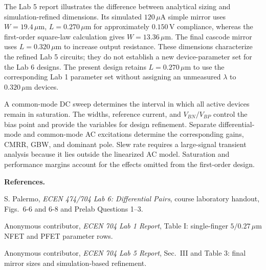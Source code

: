 \documentclass[12pt,letterpaper]{article}
\newcommand{\um}{\,\mu\mathrm{m}}
\newcommand{\uA}{\,\mu\mathrm{A}}
\newcommand{\V}{\,\mathrm{V}}
\begin{document}
The Lab 5 report illustrates the difference between analytical
sizing and simulation-refined dimensions. Its simulated $120\uA$
simple mirror uses $W=19.4\um$,
$L=0.270\um$ for approximately $0.150\V$ compliance, whereas
the first-order square-law calculation gives $W=13.36\um$.
The final cascode mirror uses $L=0.320\um$ to increase output
resistance. These dimensions characterize the refined Lab 5 circuits;
they do not establish a new device-parameter set for the Lab 6 designs.
The present design retains $L=0.270\um$ to use the corresponding
Lab 1 parameter set without assigning an unmeasured $\lambda$
to $0.320\um$ devices.

A common-mode DC sweep determines the interval in which all active
devices remain in saturation. The widths, reference current, and
$V_{BN}/V_{BP}$ control the bias point and provide the variables
for design refinement. Separate differential-mode
and common-mode AC excitations determine the corresponding gains,
CMRR, GBW, and dominant pole. Slew rate requires a large-signal
transient analysis because it lies outside the linearized AC model.
Saturation and performance margins account for the effects omitted
from the first-order design.

\vspace{12pt}
\textbf{References.}
\begin{enumerate}[label={[\arabic*]},leftmargin=0.3in,
topsep=4pt,itemsep=5pt,parsep=0pt]
\item S. Palermo, \emph{ECEN 474/704 Lab 6: Differential Pairs},
course laboratory handout, Figs.~6-6 and 6-8 and Prelab Questions 1--3.
\item Anonymous contributor, \emph{ECEN 704 Lab 1 Report}, Table I:
single-finger $5/0.27\um$ NFET and PFET parameter rows.
\item Anonymous contributor, \emph{ECEN 704 Lab 5 Report},
Sec.~III and Table 3: final mirror sizes and simulation-based refinement.
\end{enumerate}
\end{document}
